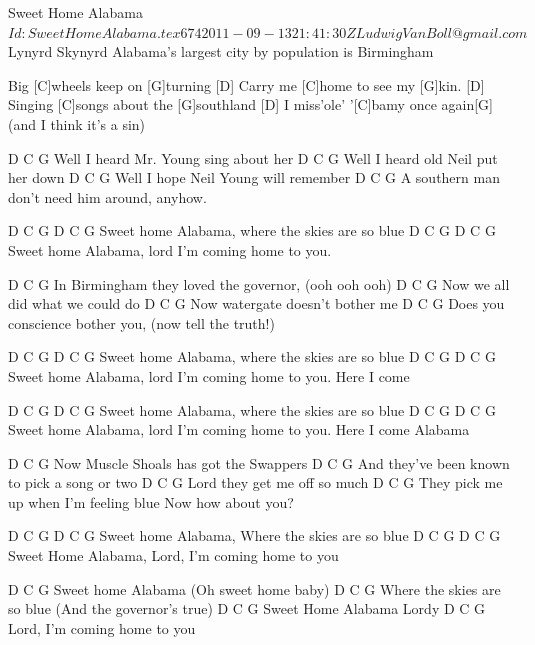\begin{SBSong}{Sweet Home Alabama}
  {$Id: SweetHomeAlabama.tex 674 2011-09-13 21:41:30Z LudwigVanBoll@gmail.com $}
  {Lynyrd Skynyrd}
  {Alabama's largest city by population is Birmingham}
  \begin{SBVerse}    
[D]   Big [C]wheels keep on [G]turning
[D]   Carry me [C]home to see my [G]kin.
[D]   Singing [C]songs about the [G]southland
[D]   I miss'ole' '[C]bamy once again[G] (and I think it's a sin)

D                C                G
Well I heard Mr. Young sing about her
D                C            G
Well I heard old Neil put her down
D                C           G
Well I hope Neil Young will remember
D          C                  G 
A southern man don’t need him around, anyhow.
  \end{SBVerse}
  \begin{SBChorus}  
D     C    G        D          C           G
Sweet home Alabama, where the skies are so blue
D     C    G        D        C              G
Sweet home Alabama, lord I’m coming home to you.
  \end{SBChorus}                     
  \begin{SBVerse}  
D         C                   G 
In Birmingham they loved the governor, (ooh ooh ooh)
D          C                 G
Now we all did what we could do
D         C            G
Now watergate doesn't bother me
D         C                G
Does you conscience bother you, (now tell the truth!)
  \end{SBVerse}
  \begin{SBChorus}  
D     C    G        D         C            G   
Sweet home Alabama, where the skies are so blue
D     C    G        D        C              G
Sweet home Alabama, lord I’m coming home to you. Here I come

D     C    G        D         C            G   
Sweet home Alabama, where the skies are so blue
D     C    G        D        C              G
Sweet home Alabama, lord I’m coming home to you. Here I come Alabama
  \end{SBChorus}                     
  \begin{SBVerse} 
D   C                         G
Now Muscle Shoals has got the Swappers
D                         C              G
And they've been known to pick a song or two
D         C          G
Lord they get me off so much
D            C                   G
They pick me up when I'm feeling blue
Now how about you?
  \end{SBVerse}
  \begin{SBChorus} 
D     C    G        D         C            G
Sweet home Alabama, Where the skies are so blue
D     C    G        D         C              G
Sweet Home Alabama, Lord, I'm coming home to you

D     C    G      
Sweet home Alabama
(Oh sweet home baby)
D         C            G
Where the skies are so blue
(And the governor's true)
D     C    G
Sweet Home Alabama
Lordy
D         C              G
Lord, I'm coming home to you
  \end{SBChorus}    
\end{SBSong}